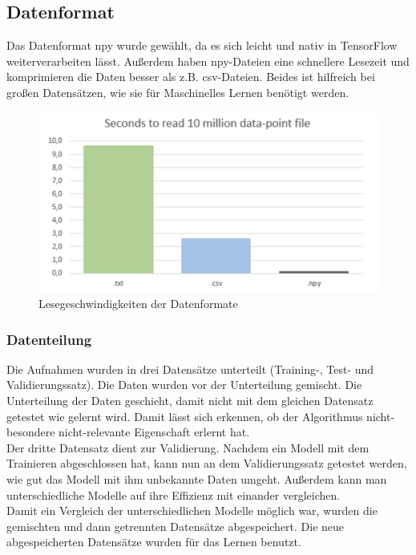 \subsection{Datenformat}
Das Datenformat npy wurde gewählt, da es sich leicht und nativ in TensorFlow weiterverarbeiten lässt.  Außerdem haben npy-Dateien eine schnellere Lesezeit und komprimieren die Daten besser als z.B. csv-Dateien. Beides ist hilfreich bei großen Datensätzen, wie sie für Maschinelles Lernen benötigt werden.\cite{url:npyFile-20210908}\\
\begin{figure}[h]
\centering
\includegraphics[scale=0.8]{pic/npyFile}
\caption{Lesegeschwindigkeiten der Datenformate \cite{url:npyFile-20210908}} \label{Lesegeschwindigkeiten}
\end{figure}

\subsubsection{Datenteilung}
Die Aufnahmen wurden in drei Datensätze unterteilt (Training-, Test- und Validierungssatz). Die Daten wurden vor der Unterteilung gemischt.  Die Unterteilung der Daten geschieht, damit nicht mit dem gleichen Datensatz getestet wie gelernt wird. Damit lässt sich erkennen, ob der Algorithmus nicht-besondere nicht-relevante Eigenschaft erlernt hat. \\
Der dritte Datensatz dient zur Validierung. Nachdem ein Modell mit dem Trainieren abgeschlossen hat, kann nun an dem Validierungssatz getestet werden, wie gut das Modell mit ihm unbekannte Daten umgeht.  Außerdem kann man unterschiedliche Modelle auf ihre Effizienz mit einander vergleichen.\\
Damit ein Vergleich der unterschiedlichen Modelle möglich war, wurden die gemischten und dann getrennten Datensätze abgespeichert. Die neue abgespeicherten Datensätze wurden für das Lernen benutzt.
